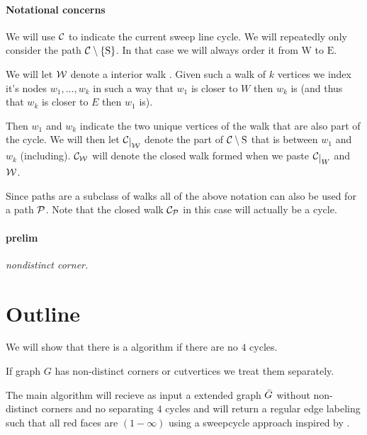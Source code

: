 



\maketitle

\newcommand{\mrN}{\mathrm{N}}
\newcommand{\mrS}{\mathrm{S}}
\newcommand{\mrE}{\mathrm{E}}
\newcommand{\mrW}{\mathrm{W}}


\paragraph{Notational concerns}
We will use $\C$ to indicate the current sweep line cycle. 
We will repeatedly only consider the path $\cpath$. In that case we will always order it from $\mrW$ to $\mrE$. 

We will let $\W$ denote a interior walk  . Given such a walk of $k$ vertices we index it's nodes $w_1, \ldots, w_k$  in such a way that $w_1$ is closer to $W$ then $w_k$ is (and thus that $w_k$ is closer to $E$ then $w_1$ is). 

Then $w_1$ and $w_k$ indicate the two unique vertices of the walk that are also part of the cycle. We will then let $\restC{\W}$ denote the part of $\C\setminus {\mathrm{S}}$ that is between $w_1$ and $w_k$ (including). $\C_\W$ will denote the closed walk formed when we paste $\restC{W}$ and $\W$.

Since paths are a subclass of walks all of the above notation can also be used for a path $\P$. Note that the closed walk $\C_\P$ in this case will actually be a cycle.


\paragraph{prelim}
\emph{nondistinct corner.}

\section{Outline}
We will show that there is a algorithm if there are no $4$ cycles.

If graph $G$ has non-distinct corners or cutvertices we treat them separately.


The main algorithm will recieve as input a extended graph $\ext G$ without non-distinct corners and no separating $4$ cycles and will return a regular edge labeling such that all red faces are $(1-\infty)$ using a sweepcycle approach inspired by \Fusy {} \cite{F}.

